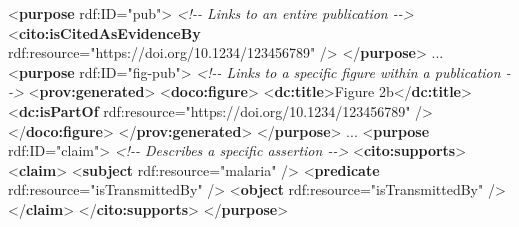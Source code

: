 \documentclass[manuscript,authordraft]{acmart}
\newenvironment{Shaded}{}{}
\newcommand{\CommentTok}[1]{\textcolor[rgb]{0.38,0.63,0.69}{\textit{#1}}}
\newcommand{\KeywordTok}[1]{\textcolor[rgb]{0.00,0.44,0.13}{\textbf{#1}}}
\newcommand{\NormalTok}[1]{#1}
\newcommand{\OtherTok}[1]{\textcolor[rgb]{0.00,0.44,0.13}{#1}}
\newcommand{\StringTok}[1]{\textcolor[rgb]{0.25,0.44,0.63}{#1}}
\begin{document}
\begin{Shaded}
\begin{Highlighting}[]
\NormalTok{\textless{}}\KeywordTok{purpose}\OtherTok{ rdf:ID=}\StringTok{"pub"}\NormalTok{\textgreater{}}
  \CommentTok{\textless{}!{-}{-} Links to an entire publication {-}{-}\textgreater{}}
\NormalTok{  \textless{}}\KeywordTok{cito:isCitedAsEvidenceBy}\OtherTok{ rdf:resource=}\StringTok{"https://doi.org/10.1234/123456789"}\NormalTok{ /\textgreater{}}
\NormalTok{\textless{}/}\KeywordTok{purpose}\NormalTok{\textgreater{}}
\NormalTok{...}
\NormalTok{\textless{}}\KeywordTok{purpose}\OtherTok{ rdf:ID=}\StringTok{"fig{-}pub"}\NormalTok{\textgreater{}}
  \CommentTok{\textless{}!{-}{-} Links to a specific figure within a publication {-}{-}\textgreater{}}
\NormalTok{  \textless{}}\KeywordTok{prov:generated}\NormalTok{\textgreater{}}
\NormalTok{    \textless{}}\KeywordTok{doco:figure}\NormalTok{\textgreater{}}
\NormalTok{      \textless{}}\KeywordTok{dc:title}\NormalTok{\textgreater{}Figure 2b\textless{}/}\KeywordTok{dc:title}\NormalTok{\textgreater{}}
\NormalTok{      \textless{}}\KeywordTok{dc:isPartOf}\OtherTok{ rdf:resource=}\StringTok{"https://doi.org/10.1234/123456789"}\NormalTok{ /\textgreater{}}
\NormalTok{    \textless{}/}\KeywordTok{doco:figure}\NormalTok{\textgreater{}}
\NormalTok{  \textless{}/}\KeywordTok{prov:generated}\NormalTok{\textgreater{}}
\NormalTok{\textless{}/}\KeywordTok{purpose}\NormalTok{\textgreater{}}
\NormalTok{...}
\NormalTok{\textless{}}\KeywordTok{purpose}\OtherTok{ rdf:ID=}\StringTok{"claim"}\NormalTok{\textgreater{}}
  \CommentTok{\textless{}!{-}{-} Describes a specific assertion {-}{-}\textgreater{}}
\NormalTok{  \textless{}}\KeywordTok{cito:supports}\NormalTok{\textgreater{}}
\NormalTok{    \textless{}}\KeywordTok{claim}\NormalTok{\textgreater{}}
\NormalTok{      \textless{}}\KeywordTok{subject}\OtherTok{ rdf:resource=}\StringTok{"malaria"}\NormalTok{ /\textgreater{}}
\NormalTok{      \textless{}}\KeywordTok{predicate}\OtherTok{ rdf:resource=}\StringTok{"isTransmittedBy"}\NormalTok{ /\textgreater{}}
\NormalTok{      \textless{}}\KeywordTok{object}\OtherTok{ rdf:resource=}\StringTok{"isTransmittedBy"}\NormalTok{ /\textgreater{}}
\NormalTok{    \textless{}/}\KeywordTok{claim}\NormalTok{\textgreater{}}
\NormalTok{  \textless{}/}\KeywordTok{cito:supports}\NormalTok{\textgreater{}}
\NormalTok{\textless{}/}\KeywordTok{purpose}\NormalTok{\textgreater{}}
\end{Highlighting}
\end{Shaded}

\normalsize
\end{document}
